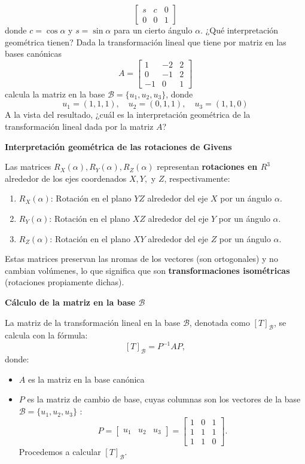 \begin{enumerate}[label=\color{red}\textbf{\arabic*)}]
{\[\begin{bmatrix}
    s & c & 0\\
    0 & 0 & 1
\end{bmatrix}  
\]donde $c=\cos\alpha$ y $s=\sin\alpha$ para un cierto ángulo $\alpha$. ¿Qué interpretación geométrica tienen?\newline
Dada la transformación lineal que tiene por matriz en las bases canónicas \[
A=\begin{bmatrix} 
    1 & -2 & 2\\
    0 & -1 & 2\\
    -1 & 0 & 1
\end{bmatrix} 
\]calcula la matriz en la base $\mathcal{B}=\{u_1,u_2,u_3\} $, donde \[
u_1=(1,1,1),\quad u_2=(0,1,1),\quad u_3=(1,1,0)
\]A la vista del resultado, ¿cuál es la interpretación geométrica de la transformación lineal dada por la matriz $A$?}

\textbf{Interpretación geométrica de las rotaciones de Givens} 

Las matrices $R_X(\alpha), R_Y(\alpha),R_Z(\alpha)$ representan \textbf{rotaciones en $R^3$} alrededor de los ejes coordenados $X,Y,$ y $Z$, respectivamente:
 \begin{enumerate}[label=\arabic*.]
    \item $R_X(\alpha)$: Rotación en el plano $YZ$ alrededor del eje $X$ por un ángulo $\alpha$.
    \item $R_Y(\alpha)$: Rotación en el plano $XZ$ alrededor del eje $Y$ por un ángulo $\alpha$.
    \item $R_Z(\alpha)$: Rotación en el plano $XY$ alrededor del eje $Z$ por un ángulo $\alpha$.
\end{enumerate}
Estas matrices preservan las nromas de los vectores (son ortogonales) y no cambian volúmenes, lo que significa que son \textbf{transformaciones isométricas} (rotaciones propiamente dichas).

\textbf{Cálculo de la matriz en la base $\mathcal{B}$} 

La matriz de la transformación lineal en la base $\mathcal{B}$, denotada como $[T]_{\mathcal{B}}$, se calcula con la fórmula: \[
    [T]_{\mathcal{B}}=P^{-1}AP,
\] donde:
\begin{itemize}[label=\textbullet]
    \item $A$ es la matriz en la base canónica
    \item $P$ es la matriz de cambio de base, cuyas columnas son los vectores de la base $\mathcal{B}=\{u_1,u_2,u_3\} $ : \[
            P=\begin{bmatrix} 
                u_1 & u_2 & u_3 
            \end{bmatrix} =\begin{bmatrix} 
                1 & 0 & 1 \\
                1 & 1 & 1 \\
                1 & 1 & 0
            \end{bmatrix} .
    \] 
    Procedemos a calcular $[T]_{\mathcal{B}}$.


\end{itemize}
\end{enumerate}
